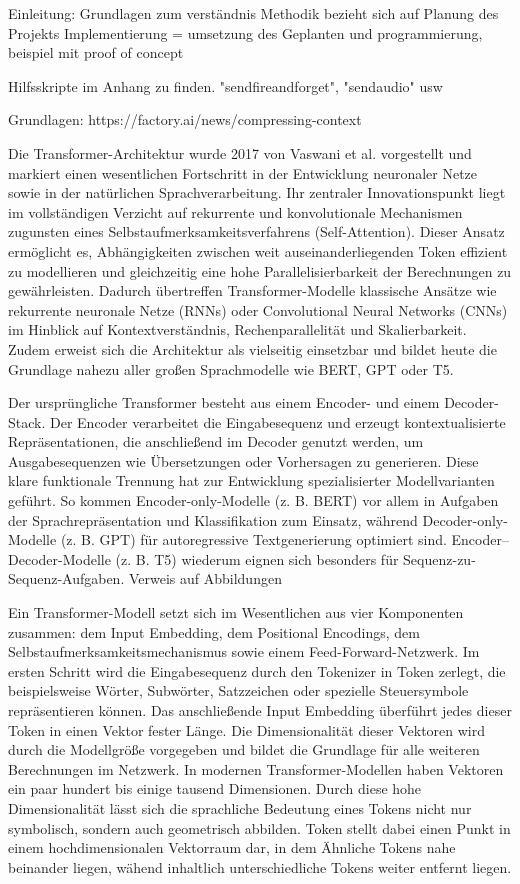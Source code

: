 Einleitung: 
Grundlagen zum verständnis 
Methodik bezieht sich auf Planung des Projekts
Implementierung = umsetzung des Geplanten und programmierung, beispiel mit proof of concept

Hilfsskripte im Anhang zu finden. "sendfireandforget", "sendaudio" usw 

Grundlagen: 
https://factory.ai/news/compressing-context

Die Transformer-Architektur wurde 2017 von Vaswani et al. vorgestellt und markiert einen wesentlichen Fortschritt in der Entwicklung neuronaler Netze sowie in der natürlichen Sprachverarbeitung. Ihr zentraler Innovationspunkt liegt im vollständigen Verzicht auf rekurrente und konvolutionale Mechanismen zugunsten eines Selbstaufmerksamkeitsverfahrens (Self-Attention). Dieser Ansatz ermöglicht es, Abhängigkeiten zwischen weit auseinanderliegenden Token effizient zu modellieren und gleichzeitig eine hohe Parallelisierbarkeit der Berechnungen zu gewährleisten. Dadurch übertreffen Transformer-Modelle klassische Ansätze wie rekurrente neuronale Netze (RNNs) oder Convolutional Neural Networks (CNNs) im Hinblick auf Kontextverständnis, Rechenparallelität und Skalierbarkeit. Zudem erweist sich die Architektur als vielseitig einsetzbar und bildet heute die Grundlage nahezu aller großen Sprachmodelle wie BERT, GPT oder T5.

Der ursprüngliche Transformer besteht aus einem Encoder- und einem Decoder-Stack. Der Encoder verarbeitet die Eingabesequenz und erzeugt kontextualisierte Repräsentationen, die anschließend im Decoder genutzt werden, um Ausgabesequenzen wie Übersetzungen oder Vorhersagen zu generieren. Diese klare funktionale Trennung hat zur Entwicklung spezialisierter Modellvarianten geführt. So kommen Encoder-only-Modelle (z. B. BERT) vor allem in Aufgaben der Sprachrepräsentation und Klassifikation zum Einsatz, während Decoder-only-Modelle (z. B. GPT) für autoregressive Textgenerierung optimiert sind. Encoder–Decoder-Modelle (z. B. T5) wiederum eignen sich besonders für Sequenz-zu-Sequenz-Aufgaben. Verweis auf Abbildungen

Ein Transformer-Modell setzt sich im Wesentlichen aus vier Komponenten zusammen: dem Input Embedding, dem Positional Encodings, dem Selbstaufmerksamkeitsmechanismus sowie einem Feed-Forward-Netzwerk. Im ersten Schritt wird die Eingabesequenz durch den Tokenizer in Token zerlegt, die beispielsweise Wörter, Subwörter, Satzzeichen oder spezielle Steuersymbole repräsentieren können. Das anschließende Input Embedding überführt jedes dieser Token in einen Vektor fester Länge. Die Dimensionalität dieser Vektoren wird durch die Modellgröße vorgegeben und bildet die Grundlage für alle weiteren Berechnungen im Netzwerk. In modernen Transformer-Modellen haben Vektoren ein paar hundert bis einige tausend Dimensionen. Durch diese hohe Dimensionalität lässt sich die sprachliche Bedeutung eines Tokens nicht nur symbolisch, sondern auch geometrisch abbilden. Token stellt dabei einen Punkt in einem hochdimensionalen Vektorraum dar, in dem Ähnliche Tokens nahe beinander liegen, wähend inhaltlich unterschiedliche Tokens weiter entfernt liegen. 

